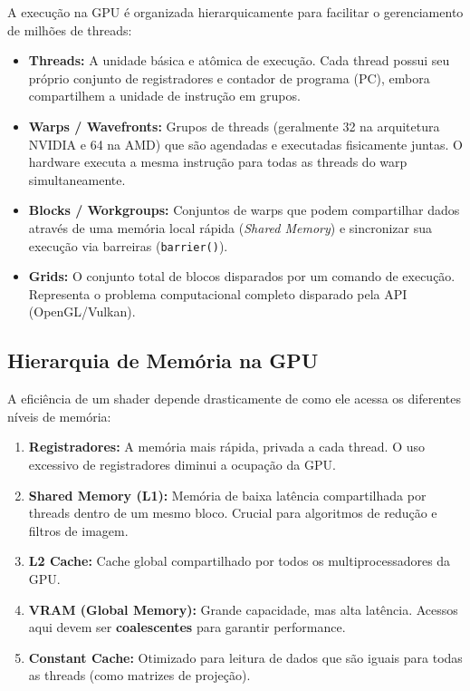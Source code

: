 A execução na GPU é organizada hierarquicamente para facilitar o gerenciamento de milhões de threads:
\begin{itemize}
    \item \textbf{Threads:} A unidade básica e atômica de execução. Cada thread possui seu próprio conjunto de registradores e contador de programa (PC), embora compartilhem a unidade de instrução em grupos.
    \item \textbf{Warps / Wavefronts:} Grupos de threads (geralmente 32 na arquitetura NVIDIA e 64 na AMD) que são agendadas e executadas fisicamente juntas. O hardware executa a mesma instrução para todas as threads do warp simultaneamente.
    \item \textbf{Blocks / Workgroups:} Conjuntos de warps que podem compartilhar dados através de uma memória local rápida (\textit{Shared Memory}) e sincronizar sua execução via barreiras (\texttt{barrier()}).
    \item \textbf{Grids:} O conjunto total de blocos disparados por um comando de execução. Representa o problema computacional completo disparado pela API (OpenGL/Vulkan).
\end{itemize}

\subsection{Hierarquia de Memória na GPU}

A eficiência de um shader depende drasticamente de como ele acessa os diferentes níveis de memória:
\begin{enumerate}
    \item \textbf{Registradores:} A memória mais rápida, privada a cada thread. O uso excessivo de registradores diminui a ocupação da GPU.
    \item \textbf{Shared Memory (L1):} Memória de baixa latência compartilhada por threads dentro de um mesmo bloco. Crucial para algoritmos de redução e filtros de imagem.
    \item \textbf{L2 Cache:} Cache global compartilhado por todos os multiprocessadores da GPU.
    \item \textbf{VRAM (Global Memory):} Grande capacidade, mas alta latência. Acessos aqui devem ser \textbf{coalescentes} para garantir performance.
    \item \textbf{Constant Cache:} Otimizado para leitura de dados que são iguais para todas as threads (como matrizes de projeção).
\end{enumerate}

